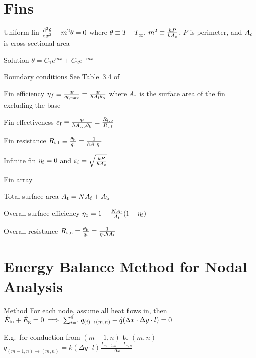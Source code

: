 \documentclass{article}
\begin{document}
\begin{multicols}{2}
\setlength{\columnseprule}{0.5pt}

\section{Fins}
\label{sec:fins}

\begin{description*}
\item[Uniform fin]
  \(\od[2]{\theta}{x} - m^2\theta = 0\) where
  \(\theta \equiv T-T_\infty\),
  \(m^2 \equiv \frac{hP}{kA_{\mathrm{c}}}\),
  $P$ is perimeter, and
  $A_{\mathrm{c}}$ is cross-sectional area
  \begin{description*}
  \item[Solution]
    \(\theta = C_1e^{mx} + C_2e^{-mx}\)
  \item[Boundary conditions] See Table~3.4 of~\cite{hamt}
  \end{description*}
\item[Fin efficiency]
  \(\eta_f \equiv \frac{q_{\mathrm{f}}}{q_{\mathrm{f,max}}}
  = \frac{q_{\mathrm{f}}}{hA_{\mathrm{f}}\theta_{\mathrm{b}}}\)
  where $A_{\mathrm{f}}$ is the surface area of the fin excluding the base
\item[Fin effectiveness]
  \(\varepsilon_{\mathrm{f}} \equiv \frac{q_{\mathrm{f}}}{hA_{\mathrm{c,b}}\theta_{\mathrm{b}}}
  = \frac{R_{\mathrm{t,b}}}{R_{\mathrm{t,f}}}\)
\item[Fin resistance]
  \(R_{\mathrm{t,f}} \equiv \frac{\theta_{\mathrm{b}}}{q_{\mathrm{f}}}
  = \frac{1}{hA_{\mathrm{f}}\eta_{\mathrm{f}}}\)
\item[Infinite fin]
  \(\eta_{\mathrm{f}} = 0\) and
  \(\varepsilon_{\mathrm{f}} = \sqrt{\frac{kP}{hA_{\mathrm{c}}}}\)
\item[Fin array]~
  \begin{description*}
  \item[Total surface area]
    \(A_{\mathrm{t}} = NA_{\mathrm{f}} + A_{\mathrm{b}}\)
  \item[Overall surface efficiency]
    \(\eta_{\mathrm{o}} = 1 - \frac{NA_{\mathrm{f}}}{A_{\mathrm{t}}}(1-\eta_{\mathrm{f}})\)
  \item[Overall resistance]
    \(R_{\mathrm{t,o}} = \frac{\theta_{\mathrm{b}}}{q_{\mathrm{t}}}
    = \frac{1}{\eta_{\mathrm{o}}hA_{\mathrm{t}}}\)
  \end{description*}
\end{description*}

\section{Energy Balance Method for Nodal Analysis}
\begin{description*}
\item[Method] For each node, assume all heat flows in, then
  \(\dot{E}_{\mathrm{in}} + \dot{E}_{\mathrm{g}} = 0 \\
  \implies \sum_{i=1}^4q_{(i)\rightarrow(m,n)} + \dot{q}(\Delta{}x\cdot\Delta{}y\cdot{}l) = 0\)
\item[E.g.\ for conduction from $(m-1,n)$ to $(m,n)$]
  \(q_{(m-1,n)\rightarrow(m,n)} = k(\Delta{}y\cdot{}l)\frac{T_{m-1,n}-T_{m,n}}{\Delta{}x}\)
\end{description*}


\end{multicols}
\end{document}
